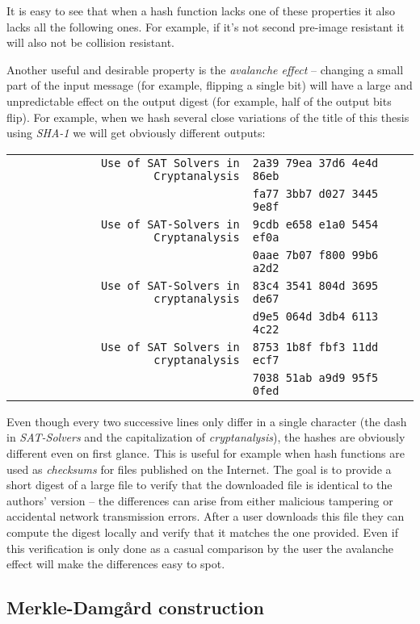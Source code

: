 It is easy to see that when a hash function lacks one of these properties it also lacks all the following ones.
For example, if it's not second pre-image resistant it will also not be collision resistant.

Another useful and desirable property is the \emph{avalanche effect} -- changing a small part of the input message (for example, flipping a single bit) will have a large and unpredictable effect on the output digest (for example, half of the output bits flip).
For example, when we hash several close variations of the title of this thesis using \emph{SHA-1} we will get obviously different outputs:

\begin{tabular}{r l}
\texttt{Use of SAT Solvers in Cryptanalysis} & \texttt{2a39 79ea 37d6 4e4d 86eb} \\
& \texttt{fa77 3bb7 d027 3445 9e8f} \\
\texttt{Use of SAT-Solvers in Cryptanalysis} & \texttt{9cdb e658 e1a0 5454 ef0a}\\
& \texttt{0aae 7b07 f800 99b6 a2d2} \\
\texttt{Use of SAT-Solvers in cryptanalysis} & \texttt{83c4 3541 804d 3695 de67}\\
& \texttt{d9e5 064d 3db4 6113 4c22} \\
\texttt{Use of SAT Solvers in cryptanalysis} & \texttt{8753 1b8f fbf3 11dd ecf7} \\
& \texttt{7038 51ab a9d9 95f5 0fed}
\end{tabular}

Even though every two successive lines only differ in a single character (the dash in \emph{SAT-Solvers} and the capitalization of \emph{cryptanalysis}), the hashes are obviously different even on first glance.
This is useful for example when hash functions are used as \emph{checksums} for files published on the Internet.
The goal is to provide a short digest of a large file to verify that the downloaded file is identical to the authors' version -- the differences can arise from either malicious tampering or accidental network transmission errors.
After a user downloads this file they can compute the digest locally and verify that it matches the one provided.
Even if this verification is only done as a casual comparison by the user the avalanche effect will make the differences easy to spot.

\subsection{Merkle-Damg\aa rd construction}

